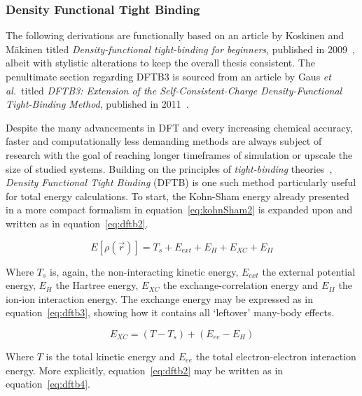 \documentclass[11pt]{article}
\begin{document}
\subsubsection{Density Functional Tight Binding}
The following derivations are functionally based on an article by Koskinen and Mäkinen titled \textit{Density-functional tight-binding for beginners}, published in 2009~\cite{Koskinen2009}, albeit with stylistic alterations to keep the overall thesis consistent.
The penultimate section regarding DFTB3 is sourced from an article by Gaus \textit{et al.}~titled \textit{DFTB3: Extension of the Self-Consistent-Charge Density-Functional Tight-Binding Method}, published in 2011~\cite{Gaus2011}.
\\ \par \noindent Despite the many advancements in DFT and every increasing chemical accuracy, faster and computationally less demanding methods are always subject of research with the goal of reaching longer timeframes of simulation or upscale the size of studied systems.
Building on the principles of \textit{tight-binding} theories~\cite{Goringe1997},  \textit{Density Functional Tight Binding} (DFTB) is one such method particularly useful for total energy calculations.
To start, the Kohn-Sham energy already presented in a more compact formalism in equation~\ref{eq:kohnSham2} is expanded upon and written as in equation~\ref{eq:dftb2}.

\begin{equation}
  E[\rho(\vec{r})] = T_s + E_{ext} + E_{H} + E_{XC} + E_{II}
  \label{eq:dftb2}
\end{equation}

\bigskip

\noindent Where $T_s$ is, again, the non-interacting kinetic energy, $E_{ext}$ the external potential energy, $E_{H}$ the Hartree energy, $E_{XC}$ the exchange-correlation energy and $E_{II}$ the ion-ion interaction energy.
The exchange energy may be expressed as in equation~\ref{eq:dftb3}, showing how it contains all `leftover' many-body effects.

\begin{equation}
  E_{XC} = (T-T_s) + (E_{ee} - E_{H})
  \label{eq:dftb3}
\end{equation}

\bigskip

\noindent Where $T$ is the total kinetic energy and $E_{ee}$ the total electron-electron interaction energy.
More explicitly, equation~\ref{eq:dftb2} may be written as in equation~\ref{eq:dftb4}.
\end{document}
